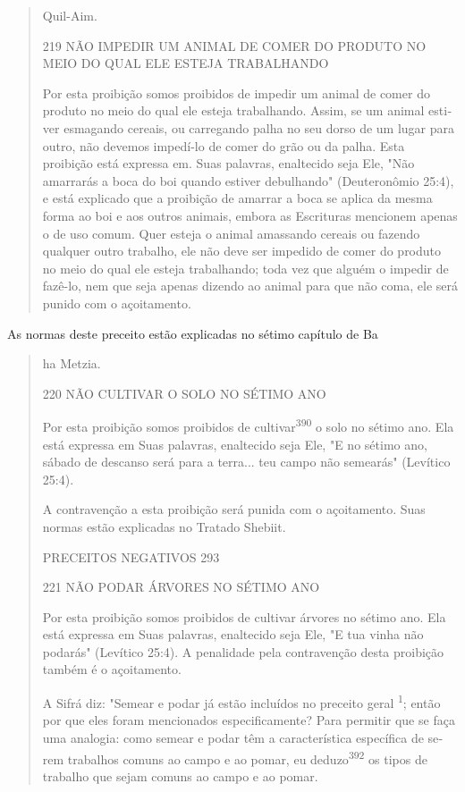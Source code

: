 \begin{quote}
Quil-Aim.

219 NÃO IMPEDIR UM ANIMAL DE COMER DO PRODUTO NO MEIO DO QUAL ELE ESTEJA
TRABALHANDO

Por esta proibição somos proibidos de impedir um animal de comer do
produto no meio do qual ele esteja trabalhando. Assim, se um animal
esti­ver esmagando cereais, ou carregando palha no seu dorso de um lugar
para ou­tro, não devemos impedí-lo de comer do grão ou da palha. Esta
proibição está expressa em. Suas palavras, enaltecido seja Ele, "Não
amarrarás a boca do boi quando estiver debulhando" (Deuteronômio 25:4),
e está explicado que a proi­bição de amarrar a boca se aplica da mesma
forma ao boi e aos outros animais, embora as Escrituras mencionem apenas
o de uso comum. Quer esteja o ani­mal amassando cereais ou fazendo
qualquer outro trabalho, ele não deve ser impedido de comer do produto
no meio do qual ele esteja trabalhando; toda vez que alguém o impedir de
fazê-lo, nem que seja apenas dizendo ao animal para que não coma, ele
será punido com o açoitamento.
\end{quote}

As normas deste preceito estão explicadas no sétimo capítulo de Ba

\begin{quote}
ha Metzia.

220 NÃO CULTIVAR O SOLO NO SÉTIMO ANO

Por esta proibição somos proibidos de cultivar\textsuperscript{390} o
solo no sétimo ano. Ela está expressa em Suas palavras, enaltecido seja
Ele, "E no sétimo ano, sábado de descanso será para a terra... teu campo
não semearás" (Levítico 25:4).

A contravenção a esta proibição será punida com o açoitamento. Suas
normas estão explicadas no Tratado Shebiit.

PRECEITOS NEGATIVOS 293

221 NÃO PODAR ÁRVORES NO SÉTIMO ANO

Por esta proibição somos proibidos de cultivar árvores no sétimo ano.
Ela está expressa em Suas palavras, enaltecido seja Ele, "E tua vinha
não podarás" (Levítico 25:4). A penalidade pela contravenção desta
proibição tam­bém é o açoitamento.

A Sifrá diz: "Semear e podar já estão incluídos no preceito geral
\textsuperscript{1}; então por que eles foram mencionados
especificamente? Para permitir que se faça uma analogia: como semear e
podar têm a característica específica de se­rem trabalhos comuns ao
campo e ao pomar, eu deduzo\textsuperscript{392} os tipos de traba­lho
que sejam comuns ao campo e ao pomar.
\end{quote}


